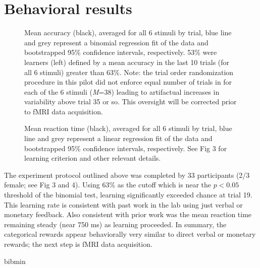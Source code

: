 \documentclass[doc,12pt]{apa}        %
\begin{document}
\section{Behavioral results} %
\label{sec:behavioral_results}

\begin{figure}[tp]
	\label{fig:acc}
	\caption{Mean accuracy (black), averaged for all 6 stimuli by trial, blue line and grey represent a binomial regression fit of the data and bootstrapped 95\% confidence intervals, respectively.  53\% were learners (left) defined by a mean accuracy in the last 10 trials (for all 6 stimuli) greater than 63\%. Note: the trial order randomization procedure in this pilot did not enforce equal number of trials in for each of the 6 stimuli (\emph{M}=38) leading to artifactual increases in variability above trial 35 or so.  This oversight will be corrected prior to fMRI data acquisition.}
\end{figure}

\begin{figure}[tp]
	\label{fig:rt}
	\caption{Mean reaction time (black), averaged for all 6 stimuli by trial, blue line and grey represent a linear regression fit of the data and bootstrapped 95\% confidence intervals, respectively. See Fig 3 for learning criterion and other relevant details.}
\end{figure}

The experiment protocol outlined above was completed by 33 participants (2/3 female; see Fig 3 and 4).  Using 63\% as the cutoff which is near the $p < 0.05$ threshold of the binomial test, learning significantly exceeded chance at trial 19.  This learning rate is consistent with past work in the lab using just verbal or monetary feedback.  Also consistent with prior work was the mean reaction time remaining steady (near 750 ms) as learning proceeded.  In summary, the categorical rewards appear behaviorally very similar to direct verbal or monetary rewards; the next step is fMRI data acquisition.

\newpage
 {bibmin}

\end{document}
